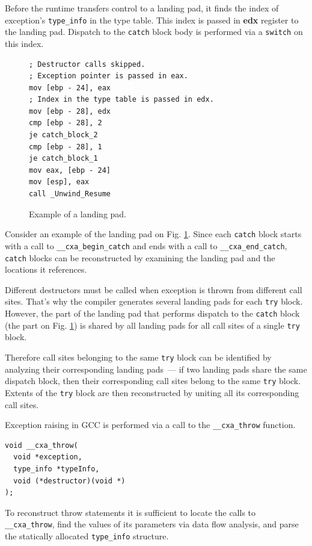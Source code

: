 \documentclass[times, 10pt,twocolumn]{article}
\renewcommand{\~}{{\raise.35ex\hbox{$\scriptstyle\sim$}}}
\begin{document}
Before the runtime transfers control to a landing pad, it 
finds the index of exception's \lstinline{type_info}
in the type table. This index is passed in \textbf{edx} register
to the landing pad. Dispatch to the \lstinline{catch} block body is
performed via a \lstinline{switch} on this index.

\begin{figure}[tb!]
\centering
{
\lstset{basicstyle=\small, language=[x86masm]Assembler}
\begin{lstlisting}
; Destructor calls skipped.
; Exception pointer is passed in eax.
mov [ebp - 24], eax
; Index in the type table is passed in edx.
mov [ebp - 28], edx
cmp [ebp - 28], 2
je catch_block_2
cmp [ebp - 28], 1
je catch_block_1
mov eax, [ebp - 24]
mov [esp], eax
call _Unwind_Resume
\end{lstlisting}
}
\caption{Example of a landing pad.}
\label{fig:lpad}
\end{figure}

Consider an example of the landing pad on Fig. \ref{fig:lpad}.
Since each \lstinline{catch} block starts with a call to \lstinline{__cxa_begin_catch}
and ends with a call to \lstinline{__cxa_end_catch},
\lstinline{catch} blocks can be reconstructed by examining
the landing pad and the locations it references.

Different destructors must be called when exception is thrown from
different call sites. That's why the compiler generates several landing
pads for each \lstinline{try} block.
However, the part of the landing pad that performs dispatch to
the \lstinline{catch} block (the part on Fig. \ref{fig:lpad}) is shared by all
landing pads for all call sites of a single \lstinline{try} block.

Therefore call sites belonging to the same \lstinline{try} block can be identified
by analyzing their corresponding landing pads~--- if two landing pads
share the same dispatch block, then their corresponding call sites
belong to the same \lstinline{try} block. Extents of the \lstinline{try}
block are then reconstructed by uniting all its corresponding
call sites.

Exception raising in GCC is performed via a call to the \lstinline{__cxa_throw} function.
{
\lstset{basicstyle=\small}
\begin{lstlisting}
void __cxa_throw(
  void *exception,
  type_info *typeInfo,
  void (*destructor)(void *)
);
\end{lstlisting}
}

To reconstruct throw statements it is sufficient to locate the calls
to \lstinline{__cxa_throw}, find the values of its parameters via
data flow analysis, and parse the statically allocated \lstinline{type_info}
structure.
\end{document}

